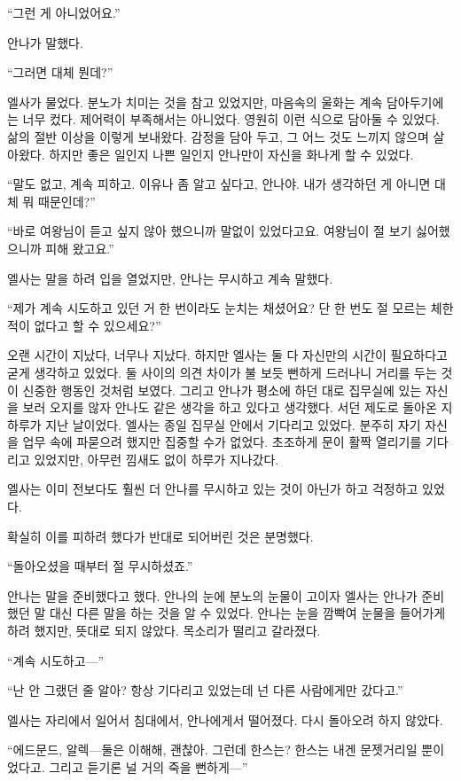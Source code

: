 ``그런 게 아니었어요.''

안나가 말했다.

``그러면 대체 뭔데?''

엘사가 물었다. 분노가 치미는 것을 참고 있었지만, 마음속의 울화는 계속 담아두기에는 너무 컸다. 제어력이 부족해서는 아니었다. 영원히 이런 식으로 담아둘 수 있었다. 삶의 절반 이상을 이렇게 보내왔다. 감정을 담아 두고, 그 어느 것도 느끼지 않으며 살아왔다. 하지만 좋은 일인지 나쁜 일인지 안나만이 자신을 화나게 할 수 있었다.

``말도 없고, 계속 피하고. 이유나 좀 알고 싶다고, 안나야. 내가 생각하던 게 아니면 대체 뭐 때문인데?''

``바로 여왕님이 듣고 싶지 않아 했으니까 말없이 있었다고요. 여왕님이 절 보기 싫어했으니까 피해 왔고요.''

엘사는 말을 하려 입을 열었지만, 안나는 무시하고 계속 말했다.

``제가 계속 시도하고 있던 거 한 번이라도 눈치는 채셨어요? 단 한 번도 절 모르는 체한 적이 없다고 할 수 있으세요?''

오랜 시간이 지났다, 너무나 지났다. 하지만 엘사는 둘 다 자신만의 시간이 필요하다고 굳게 생각하고 있었다. 둘 사이의 의견 차이가 불 보듯 뻔하게 드러나니 거리를 두는 것이 신중한 행동인 것처럼 보였다. 그리고 안나가 평소에 하던 대로 집무실에 있는 자신을 보러 오지를 않자 안나도 같은 생각을 하고 있다고 생각했다. 서던 제도로 돌아온 지 하루가 지난 날이었다. 엘사는 종일 집무실 안에서 기다리고 있었다. 분주히 자기 자신을 업무 속에 파묻으려 했지만 집중할 수가 없었다. 초조하게 문이 활짝 열리기를 기다리고 있었지만, 아무런 낌새도 없이 하루가 지나갔다.

엘사는 이미 전보다도 훨씬 더 안나를 무시하고 있는 것이 아닌가 하고 걱정하고 있었다.

확실히 이를 피하려 했다가 반대로 되어버린 것은 분명했다.

``돌아오셨을 때부터 절 무시하셨죠.''

안나는 말을 준비했다고 했다. 안나의 눈에 분노의 눈물이 고이자 엘사는 안나가 준비했던 말 대신 다른 말을 하는 것을 알 수 있었다. 안나는 눈을 깜빡여 눈물을 들어가게 하려 했지만, 뜻대로 되지 않았다. 목소리가 떨리고 갈라졌다.

``계속 시도하고—''

``난 안 그랬던 줄 알아? 항상 기다리고 있었는데 넌 다른 사람에게만 갔다고.''

엘사는 자리에서 일어서 침대에서, 안나에게서 떨어졌다. 다시 돌아오려 하지 않았다.

``에드문드, 알렉—둘은 이해해, 괜찮아. 그런데 한스는? 한스는 내겐 문젯거리일 뿐이었다고. 그리고 듣기론 널 거의 죽을 뻔하게—''

